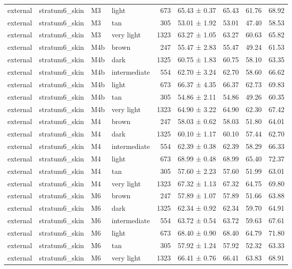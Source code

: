 \begin{tabular}{llllrlrrr}
external & stratum6\_skin & M3 & light & 673 & 65.43 ± 0.37 & 65.43 & 61.76 & 68.92 \\
external & stratum6\_skin & M3 & tan & 305 & 53.01 ± 1.92 & 53.01 & 47.40 & 58.53 \\
external & stratum6\_skin & M3 & very light & 1323 & 63.27 ± 1.05 & 63.27 & 60.63 & 65.82 \\
external & stratum6\_skin & M4b & brown & 247 & 55.47 ± 2.83 & 55.47 & 49.24 & 61.53 \\
external & stratum6\_skin & M4b & dark & 1325 & 60.75 ± 1.83 & 60.75 & 58.10 & 63.35 \\
external & stratum6\_skin & M4b & intermediate & 554 & 62.70 ± 3.24 & 62.70 & 58.60 & 66.62 \\
external & stratum6\_skin & M4b & light & 673 & 66.37 ± 4.35 & 66.37 & 62.73 & 69.83 \\
external & stratum6\_skin & M4b & tan & 305 & 54.86 ± 2.11 & 54.86 & 49.26 & 60.35 \\
external & stratum6\_skin & M4b & very light & 1323 & 64.90 ± 3.22 & 64.90 & 62.30 & 67.42 \\
external & stratum6\_skin & M4 & brown & 247 & 58.03 ± 0.62 & 58.03 & 51.80 & 64.01 \\
external & stratum6\_skin & M4 & dark & 1325 & 60.10 ± 1.17 & 60.10 & 57.44 & 62.70 \\
external & stratum6\_skin & M4 & intermediate & 554 & 62.39 ± 0.38 & 62.39 & 58.29 & 66.33 \\
external & stratum6\_skin & M4 & light & 673 & 68.99 ± 0.48 & 68.99 & 65.40 & 72.37 \\
external & stratum6\_skin & M4 & tan & 305 & 57.60 ± 2.23 & 57.60 & 51.99 & 63.01 \\
external & stratum6\_skin & M4 & very light & 1323 & 67.32 ± 1.13 & 67.32 & 64.75 & 69.80 \\
external & stratum6\_skin & M6 & brown & 247 & 57.89 ± 1.07 & 57.89 & 51.66 & 63.88 \\
external & stratum6\_skin & M6 & dark & 1325 & 62.34 ± 0.92 & 62.34 & 59.70 & 64.91 \\
external & stratum6\_skin & M6 & intermediate & 554 & 63.72 ± 0.54 & 63.72 & 59.63 & 67.61 \\
external & stratum6\_skin & M6 & light & 673 & 68.40 ± 0.90 & 68.40 & 64.79 & 71.80 \\
external & stratum6\_skin & M6 & tan & 305 & 57.92 ± 1.24 & 57.92 & 52.32 & 63.33 \\
external & stratum6\_skin & M6 & very light & 1323 & 66.41 ± 0.76 & 66.41 & 63.83 & 68.91 \\

\end{tabular}
